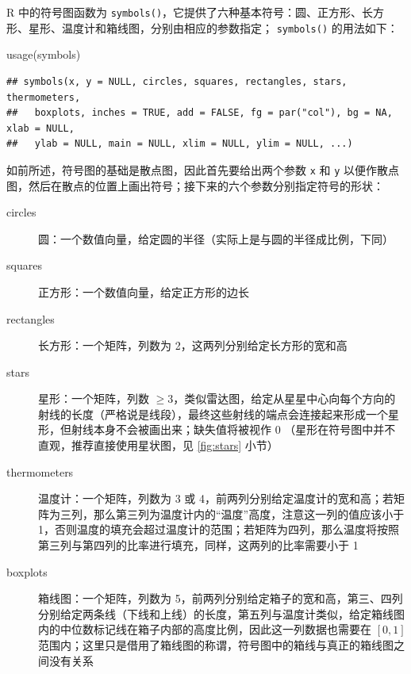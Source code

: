 \documentclass[
  b5paper,
  UTF8,twoside]{book}
\newenvironment{Shaded}{\begin{snugshade}}{\end{snugshade}}
\newcommand{\FunctionTok}[1]{\textcolor[rgb]{0.00,0.00,0.00}{#1}}
\newcommand{\NormalTok}[1]{#1}
\begin{document}
R 中的符号图函数为 \texttt{symbols()}，它提供了六种基本符号：圆、正方形、长方形、星形、温度计和箱线图，分别由相应的参数指定； \texttt{symbols()} 的用法如下：

\begin{Shaded}
\begin{Highlighting}[]
\FunctionTok{usage}\NormalTok{(symbols)}
\end{Highlighting}
\end{Shaded}

\begin{verbatim}
## symbols(x, y = NULL, circles, squares, rectangles, stars, thermometers,
##   boxplots, inches = TRUE, add = FALSE, fg = par("col"), bg = NA, xlab = NULL,
##   ylab = NULL, main = NULL, xlim = NULL, ylim = NULL, ...)
\end{verbatim}

如前所述，符号图的基础是散点图，因此首先要给出两个参数 \texttt{x} 和 \texttt{y} 以便作散点图，然后在散点的位置上画出符号；接下来的六个参数分别指定符号的形状：

\begin{description}
\item[circles]
圆：一个数值向量，给定圆的半径（实际上是与圆的半径成比例，下同）
\item[squares]
正方形：一个数值向量，给定正方形的边长
\item[rectangles]
长方形：一个矩阵，列数为 2，这两列分别给定长方形的宽和高
\item[stars]
星形：一个矩阵，列数 \(\geq3\)，类似雷达图，给定从星星中心向每个方向的射线的长度（严格说是线段），最终这些射线的端点会连接起来形成一个星形，但射线本身不会被画出来；缺失值将被视作 0 （星形在符号图中并不直观，推荐直接使用星状图，见 \ref{fig:stars} 小节）
\item[thermometers]
温度计：一个矩阵，列数为 3 或 4，前两列分别给定温度计的宽和高；若矩阵为三列，那么第三列为温度计内的``温度''高度，注意这一列的值应该小于 1，否则温度的填充会超过温度计的范围；若矩阵为四列，那么温度将按照第三列与第四列的比率进行填充，同样，这两列的比率需要小于 1
\item[boxplots]
箱线图：一个矩阵，列数为 5，前两列分别给定箱子的宽和高，第三、四列分别给定两条线（下线和上线）的长度，第五列与温度计类似，给定箱线图内的中位数标记线在箱子内部的高度比例，因此这一列数据也需要在 \([0,1]\) 范围内；这里只是借用了箱线图的称谓，符号图中的箱线与真正的箱线图之间没有关系
\end{description}
\end{document}
